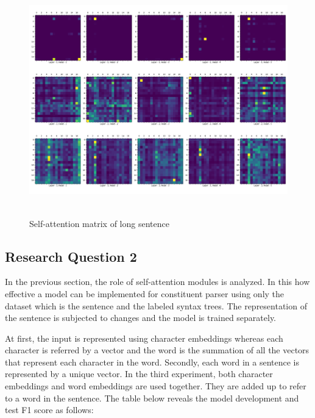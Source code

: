 \documentclass[a4paper, 11pt]{article}
\begin{document}
\begin{figure}[H]
    \centering
    \includegraphics[width=\textwidth,height=10cm,keepaspectratio=true]
    {self-attention-matrix-2.png}
    \caption{
        Self-attention matrix of long sentence
    }
    \label{fig:self-attention-matrix-large-sentence}
\end{figure}

\subsection{Research Question 2}

In the previous section, the role of self-attention modules is analyzed. In this how effective a model can be implemented for constituent parser using only the dataset which is the sentence and the labeled syntax trees. The representation of the sentence is subjected to changes and the model is trained separately. 

At first, the input is represented using character embeddings whereas each character is referred by a vector and the word is the summation of all the vectors that represent each character in the word. Secondly, each word in a sentence is represented by a unique vector. In the third experiment, both character embeddings and word embeddings are used together. They are added up to refer to a word in the sentence. The table below reveals the model development and test F1 score as follows:
\end{document}
